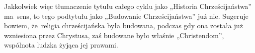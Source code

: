 \documentclass[a4paper,11pt]{article}
\begin{document}
Jakkolwiek więc tłumaczenie tytułu całego cyklu jako „Historia
Chrześcijaństwa” ma~sens, to tego podtytułu jako „Budowanie
Chrześcijaństwa” już nie. Sugeruje bowiem, że~religia chrześcijańska
była budowana, podczas gdy ona została już wzniesiona przez Chrystusa,
zaś budowane było właśnie „Christendom”, wspólnota ludzka żyjąca jej
prawami.

\VerSpaceFour










\newpage



\begin{center}


\end{center}
\end{document}
